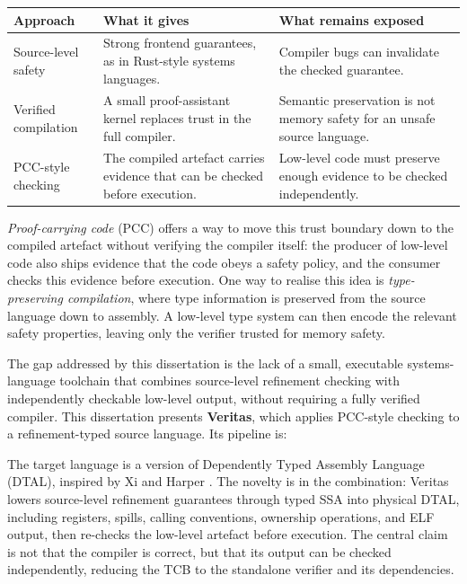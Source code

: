 \begin{table}[H]
  \centering
  \footnotesize
  \renewcommand{\arraystretch}{1.02}
  \begin{tabularx}{0.96\textwidth}{@{}>{\raggedright\arraybackslash}p{}>{\raggedright\arraybackslash}p{}>{\raggedright\arraybackslash}X@{}}
    \toprule
    \textbf{Approach} & \textbf{What it gives} & \textbf{What remains exposed} \\
    \midrule
    Source-level safety & Strong frontend guarantees, as in Rust-style systems languages. & Compiler bugs can invalidate the checked guarantee. \\
    Verified compilation & A small proof-assistant kernel replaces trust in the full compiler. & Semantic preservation is not memory safety for an unsafe source language. \\
    PCC-style checking & The compiled artefact carries evidence that can be checked before execution. & Low-level code must preserve enough evidence to be checked independently. \\
    \bottomrule
  \end{tabularx}
\end{table}


\emph{Proof-carrying code} (PCC) \cite{Necula1997PCC} offers a way to move this trust boundary down to the compiled artefact without verifying the compiler itself: the producer of low-level code also ships evidence that the code obeys a safety policy, and the consumer checks this evidence before execution. One way to realise this idea is \emph{type-preserving compilation}, where type information is preserved from the source language down to assembly. A low-level type system can then encode the relevant safety properties, leaving only the verifier trusted for memory safety.

The gap addressed by this dissertation is the lack of a small, executable systems-language toolchain that combines source-level refinement checking with independently checkable low-level output, without requiring a fully verified compiler. This dissertation presents \textbf{Veritas}, which applies PCC-style checking to a refinement-typed source language. Its pipeline is:


The target language is a version of Dependently Typed Assembly Language (DTAL), inspired by Xi and Harper \cite{Xi2001DTAL}. The novelty is in the combination: Veritas lowers source-level refinement guarantees through typed SSA into physical DTAL, including registers, spills, calling conventions, ownership operations, and ELF output, then re-checks the low-level artefact before execution. The central claim is not that the compiler is correct, but that its output can be checked independently, reducing the TCB to the standalone verifier and its dependencies.


